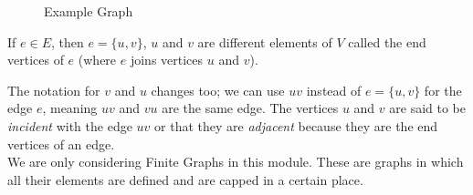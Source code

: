
\begin{minipage}{0.4\textwidth}
    \begin{figure}[H]
        \centering
        \caption{Example Graph}
    \end{figure}
\end{minipage} \hfill
\begin{minipage}{0.55\textwidth}
If $e \in E$, then $e = \{u, v\}$, $u$ and $v$ are different elements of $V$ called the end vertices of $e$ (where $e$ joins vertices $u$ and $v$). 
\end{minipage}
The notation for $v$ and $u$ changes too; we can use $uv$ instead of $e = \{u, v\}$ for the edge $e$, meaning $uv$ and $vu$ are the same edge. The vertices $u$ and $v$ are said to be \textit{incident} with the edge $uv$ or that they are \textit{adjacent} because they are the end vertices of an edge.\\

We are only considering Finite Graphs in this module. These are graphs in which all their elements are defined and are capped in a certain place.

